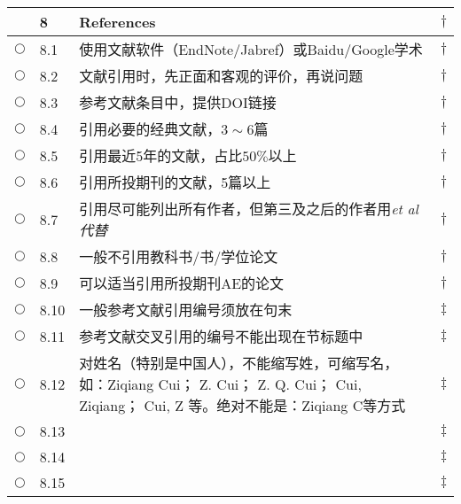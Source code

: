 \documentclass{ctexart}
\begin{document}
\begin{center}
\begin{longtable}{|l|l|p{}|l|}
& 8 & \textcolor[rgb]{0.00,0.00,1.00}{\textbf{References}}& $\dagger$\\\hline
$\bigcirc$& 8.1 & 使用文献软件（EndNote/Jabref）或Baidu/Google学术 & $\dagger$\\\hline
$\bigcirc$& 8.2 & 文献引用时，先正面和客观的评价，再说问题& $\dagger$\\\hline
$\bigcirc$& 8.3 & 参考文献条目中，提供DOI链接& $\dagger$\\\hline
$\bigcirc$& 8.4 & 引用必要的经典文献，$3\sim6$篇& $\dagger$\\\hline
$\bigcirc$& 8.5 & 引用最近5年的文献，占比$50\%$以上& $\dagger$\\\hline
$\bigcirc$& 8.6 & 引用所投期刊的文献，5篇以上& $\dagger$\\\hline
$\bigcirc$& 8.7 & 引用尽可能列出所有作者，但第三及之后的作者用\it{et al} 代替& $\dagger$\\\hline
$\bigcirc$& 8.8 & 一般不引用教科书/书/学位论文& $\dagger$\\\hline
$\bigcirc$& 8.9 & 可以适当引用所投期刊AE的论文& $\dagger$\\\hline
$\bigcirc$& 8.10 & 一般参考文献引用编号须放在句末 & $\ddagger$\\\hline
$\bigcirc$& 8.11 & 参考文献交叉引用的编号不能出现在节标题中& $\ddagger$\\\hline
$\bigcirc$& 8.12 & 对姓名（特别是中国人），不能缩写姓，可缩写名，如：Ziqiang Cui； Z. Cui； Z. Q. Cui； Cui, Ziqiang； Cui, Z 等。绝对不能是：Ziqiang C等方式 & $\ddagger$\\\hline
$\bigcirc$& 8.13 & & $\ddagger$\\\hline
$\bigcirc$& 8.14 & & $\ddagger$\\\hline
$\bigcirc$& 8.15 & & $\ddagger$\\\hline
\hline


\end{longtable}
\end{center}
\end{document}
